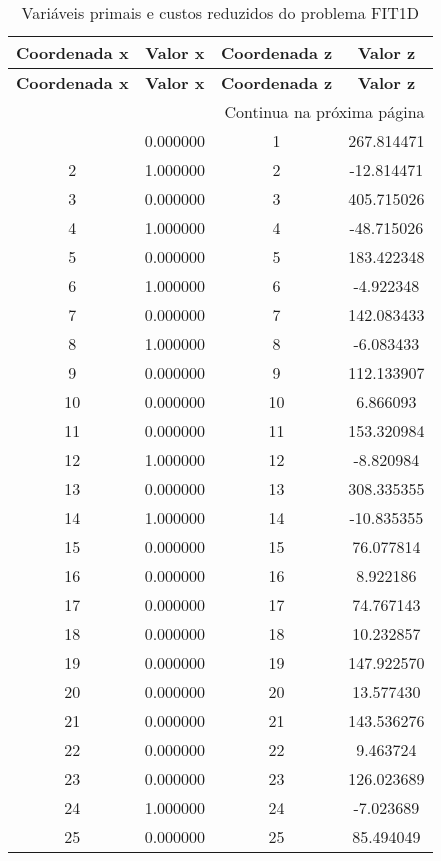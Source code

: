 \documentclass[12pt]{article}
\begin{document}
\begin{longtable}{@{}cccc@{}}
\caption{Variáveis primais e custos reduzidos do problema FIT1D} \\
\toprule
\textbf{Coordenada x} & \textbf{Valor x} & \textbf{Coordenada z} & \textbf{Valor z} \\
\midrule
\endfirsthead

\toprule
\textbf{Coordenada x} & \textbf{Valor x} & \textbf{Coordenada z} & \textbf{Valor z} \\
\midrule
\endhead

\midrule \multicolumn{4}{r}{{Continua na próxima página}} \\ \midrule
\endfoot

\bottomrule
\endlastfoot
1 & 0.000000 & 1 & 267.814471 \\
2 & 1.000000 & 2 & -12.814471 \\
3 & 0.000000 & 3 & 405.715026 \\
4 & 1.000000 & 4 & -48.715026 \\
5 & 0.000000 & 5 & 183.422348 \\
6 & 1.000000 & 6 & -4.922348 \\
7 & 0.000000 & 7 & 142.083433 \\
8 & 1.000000 & 8 & -6.083433 \\
9 & 0.000000 & 9 & 112.133907 \\
10 & 0.000000 & 10 & 6.866093 \\
11 & 0.000000 & 11 & 153.320984 \\
12 & 1.000000 & 12 & -8.820984 \\
13 & 0.000000 & 13 & 308.335355 \\
14 & 1.000000 & 14 & -10.835355 \\
15 & 0.000000 & 15 & 76.077814 \\
16 & 0.000000 & 16 & 8.922186 \\
17 & 0.000000 & 17 & 74.767143 \\
18 & 0.000000 & 18 & 10.232857 \\
19 & 0.000000 & 19 & 147.922570 \\
20 & 0.000000 & 20 & 13.577430 \\
21 & 0.000000 & 21 & 143.536276 \\
22 & 0.000000 & 22 & 9.463724 \\
23 & 0.000000 & 23 & 126.023689 \\
24 & 1.000000 & 24 & -7.023689 \\
25 & 0.000000 & 25 & 85.494049 \\

\end{longtable}
\end{document}
